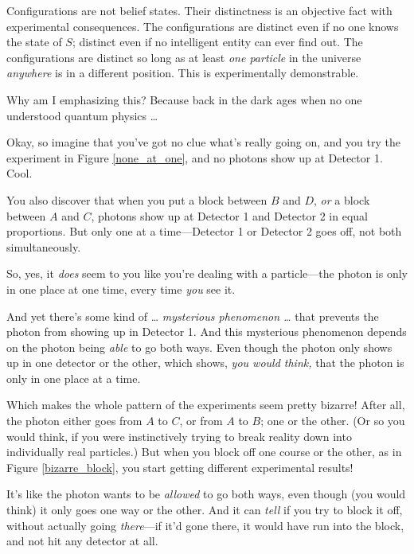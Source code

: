 {
 Configurations are not belief states. Their distinctness is an
objective fact with experimental consequences. The configurations are
distinct even if no one knows the state of $S$; distinct even if no
intelligent entity can ever find out. The configurations are distinct
so long as at least \textit{one particle} in the universe
\textit{anywhere} is in a different position. This is experimentally
demonstrable.}

{
 Why am I emphasizing this? Because back in the dark ages when no
one understood quantum physics \ldots}


{
 Okay, so imagine that you've got no clue
what's really going on, and you try the experiment in
Figure \ref{none_at_one}, and no photons show up at Detector 1. Cool.}

{
 You also discover that when you put a block between $B$ and $D$,
\textit{or} a block between $A$ and $C$, photons show up at Detector 1 and
Detector 2 in equal proportions. But only one at a time---Detector 1 or
Detector 2 goes off, not both simultaneously.}

{
 So, yes, it \textit{does} seem to you like you're
dealing with a particle---the photon is only in one place at one time,
every time \textit{you} see it.}

{
 And yet there's some kind of \ldots
\textit{mysterious phenomenon \ldots} that prevents the photon from
showing up in Detector 1. And this mysterious phenomenon depends on the
photon being \textit{able} to go both ways. Even though the photon only
shows up in one detector or the other, which shows, \textit{you would
think,} that the photon is only in one place at a time.}


{
 Which makes the whole pattern of the experiments seem pretty
bizarre! After all, the photon either goes from $A$ to $C$, or from $A$ to $B$;
one or the other. (Or so you would think, if you were instinctively
trying to break reality down into individually real particles.) But
when you block off one course or the other, as in Figure \ref{bizarre_block}, you
start getting different experimental results!}

{
 It's like the photon wants to be \textit{allowed}
to go both ways, even though (you would think) it only goes one way or
the other. And it can \textit{tell} if you try to block it off, without
actually going \textit{there}{}---if it'd gone there,
it would have run into the block, and not hit any detector at all.}

